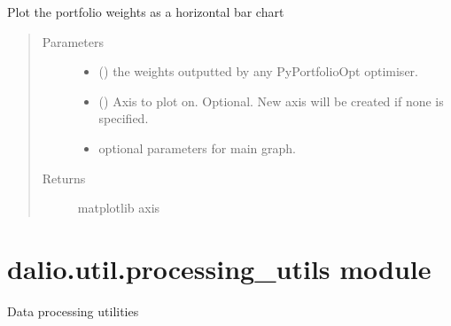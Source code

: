 \documentclass[letterpaper,10pt,english]{sphinxmanual}
\begin{document}
\begin{fulllineitems}
\label{\detokenize{dalio.util:dalio.util.plotting_utils.plot_weights}}
Plot the portfolio weights as a horizontal bar chart
\begin{quote}\begin{description}
\item[{Parameters}] \leavevmode\begin{itemize}
\item {} 
 () \textendash{} the weights outputted by any PyPortfolioOpt
optimiser.

\item {} 
 (\sphinxstyleliteralemphasis{\sphinxupquote{, }}) \textendash{} Axis to plot on. Optional. New axis will
be created if none is specified.

\item {} 
 \textendash{} optional parameters for main graph.

\end{itemize}

\item[{Returns}] \leavevmode
matplotlib axis

\end{description}\end{quote}

\end{fulllineitems}



\section{dalio.util.processing\_utils module}
\label{\detokenize{dalio.util:module-dalio.util.processing_utils}}\label{\detokenize{dalio.util:dalio-util-processing-utils-module}}
Data processing utilities
\end{document}

